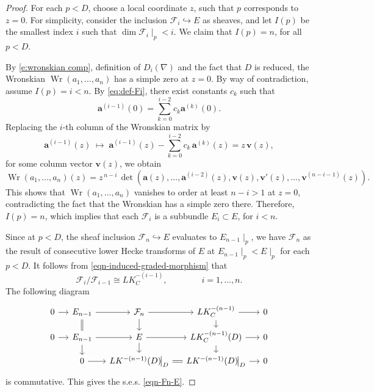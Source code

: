 \documentclass[twoside, 11pt]{article}
\numberwithin{equation}{section}
\theoremstyle{theorem}
\numberwithin{theorem}{section}
\theoremstyle{definition}
\begin{document}
\begin{proof}
For each \(p < D\), choose a local coordinate \(z\), such that \(p\) corresponds to \( z = 0\). 
For simplicity, consider the inclusion \(\mathcal{F}_i \hookrightarrow E\) as sheaves,
and let \(I(p)\) be the smallest index \(i\) such that 
\(\dim \mathcal{F}_i\mid_p < i\). 
We claim that \(I(p) = n\), for all $p < D$.

By \eqref{e:wronskian comp}, definition of $D_i(\nabla)$ 
and the fact that $D$ is reduced, the Wronskian 
\(\operatorname{Wr}(a_1, \dots, a_n)\) 
has a simple zero at \( z = 0\).
By way of contradiction, assume \(I(p)=i < n\). By \eqref{eq:def-Fi}, there exist constants \( c_k \) such that
\[
\boldsymbol{a}^{(i-1)}(0) = \sum_{k=0}^{i-2} c_k \boldsymbol{a}^{(k)}(0).
\]
Replacing the \(i\)-th column of the Wronskian matrix by
\[
\boldsymbol{a}^{(i-1)}(z) 
\;\longmapsto\; 
\boldsymbol{a}^{(i-1)}(z) - \sum_{k=0}^{i-2} c_k\, \boldsymbol{a}^{(k)}(z)
= z \, \mathbf{v}(z),
\]
for some column vector \(\mathbf{v}(z)\), we obtain
\[
\operatorname{Wr}(a_1, \dots, a_n)(z) 
= z^{\,n - i} \,
\det\!\left(
\boldsymbol{a}(z), 
\dots, 
\boldsymbol{a}^{(i-2)}(z), 
\boldsymbol{v}(z), 
\boldsymbol{v}'(z), 
\dots, 
\boldsymbol{v}^{(n - i - 1)}(z)
\right).
\]
This shows that 
\(\operatorname{Wr}(a_1, \dots, a_n)\) 
vanishes to order at least \(n - i > 1\) at \(z = 0\), 
contradicting the fact that the Wronskian has a simple zero there. 
Therefore, \(I(p) = n\), which implies that each $\mathcal{F}_i$ is a subbundle $E_i \subset E$, for $i<n$.

Since at $p < D$, the sheaf inclusion
$\mathcal{F}_n \hookrightarrow E$
evaluates to $E_{n-1}\mid_p$, 
we have $\mathcal{F}_n$ as the result of consecutive 
lower Hecke transforms of $E$ at $E_{n-1}\mid_p < E\mid_p$ 
for each $p < D$.
It follows from \eqref{eqn-induced-graded-morphism} that 
$$
\mathcal{F}_i / \mathcal{F}_{i-1} \cong L K_C^{-(i-1)}, 
\qquad \qquad i = 1, \dots, n.
$$
The following diagram
\[
\begin{tikzcd}[column sep=small, row sep=small]
0 \arrow[r] 
  & E_{n-1} \arrow[r] \arrow[d, equal] 
  & \mathcal{F}_{n} \arrow[r] \arrow[d] 
  & L K_C^{-(n-1)} \arrow[r] \arrow[d] 
  & 0 \\
0 \arrow[r] 
  & E_{n-1} \arrow[r] \arrow[d] 
  & E \arrow[r] \arrow[d] 
  & L K_C^{-(n-1)}(D) \arrow[r] \arrow[d] 
  & 0 \\ 
  & 0 \arrow[r] 
  & L K^{-(n-1)}(D)\!\big|_{D} \arrow[r, equal] 
  & L K^{-(n-1)}(D)\!\big|_{D}  \arrow[r] 
  & 0
\end{tikzcd}
\]
is commutative. 
This gives the s.e.s. \eqref{eqn-Fn-E}.
\end{proof}
\end{document}
